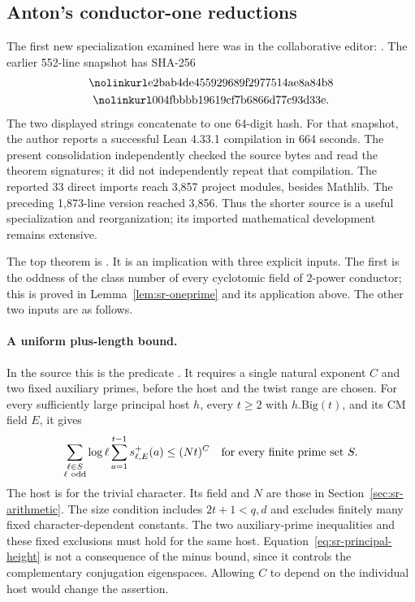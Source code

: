 \subsection{Anton's conductor-one reductions}
The first new specialization examined here was in the collaborative editor:
\href{https://principia-math.com/projects/d16ab288ed353bc5b10e292ace0ddbc1/editor?file=b64c07f1e23480429eacd6b354f04f26}{}.
The earlier 552-line snapshot has SHA-256
\[
 \begin{gathered}
 \srcid{e2bab4de455929689f2977514ae8a84b8}\\
 \srcid{004fbbbb19619cf7b6866d77c93d33e}.
 \end{gathered}
\]
The two displayed strings concatenate to one 64-digit hash.
For that snapshot, the author reports a successful Lean 4.33.1
compilation in 664 seconds.
The present consolidation independently checked the source bytes and
read the theorem signatures; it did not independently repeat that
compilation. The reported 33 direct imports reach 3,857 project
modules, besides Mathlib. The preceding 1,873-line version reached
3,856. Thus the shorter source is a useful specialization and
reorganization; its imported mathematical development remains extensive.

The top theorem is
.
It is an implication with three explicit inputs.
The first is the oddness of the class number of every cyclotomic field
of \(2\)-power conductor; this is proved in
Lemma~\ref{lem:sr-oneprime} and its application above.
The other two inputs are as follows.

\paragraph{A uniform plus-length bound.}
In the source this is the predicate .
It requires a single natural exponent \(C\) and two fixed auxiliary
primes, before the host and the twist range are chosen.
For every sufficiently large principal host \(h\), every
\(t\geq2\) with \(h.\mathrm{Big}(t)\), and its CM field \(E\), it gives
\begin{equation}\label{eq:sr-principal-height}
 \sum_{\substack{\ell\in S\\\ell\ \mathrm{odd}}}\log\ell
       \sum_{a=1}^{t-1}s^+_{\ell,E}(a)
                       \leq(Nt)^C
       \quad\hbox{for every finite prime set }S .
\end{equation}
The host is for the trivial character. Its field and \(N\) are those
in Section~\ref{sec:sr-arithmetic}.
The size condition includes \(2t+1<q,d\) and excludes finitely many
fixed character-dependent constants. The two auxiliary-prime
inequalities and these fixed exclusions must hold for the same host.
Equation~\eqref{eq:sr-principal-height} is not a consequence of the minus
bound, since it controls the complementary conjugation eigenspaces.
Allowing \(C\) to depend on the individual host would change the assertion.

